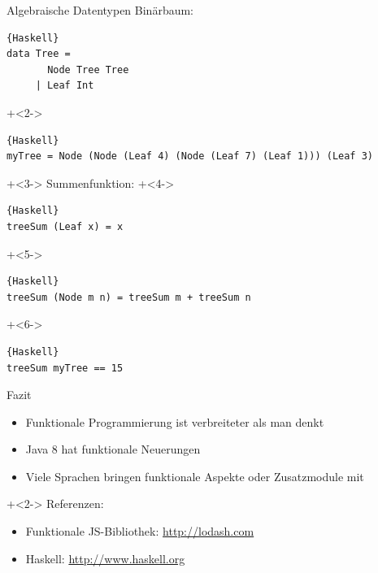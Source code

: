 \begin{frame}[fragile]{Algebraische Datentypen}
Binärbaum:
\begin{lstlisting}{Haskell}
data Tree =
       Node Tree Tree
     | Leaf Int
\end{lstlisting}

\onslide+<2->
\begin{lstlisting}{Haskell}
myTree = Node (Node (Leaf 4) (Node (Leaf 7) (Leaf 1))) (Leaf 3)
\end{lstlisting}


\onslide+<3->
Summenfunktion:
\onslide+<4->
\begin{lstlisting}{Haskell}
treeSum	(Leaf x) = x
\end{lstlisting}
\onslide+<5->
\vspace{-1.1em}
\begin{lstlisting}{Haskell}
treeSum (Node m n) = treeSum m + treeSum n
\end{lstlisting}
\onslide+<6->
\begin{lstlisting}{Haskell}
treeSum myTree == 15
\end{lstlisting}
\end{frame}


\begin{frame}[fragile]{Fazit}
\begin{itemize}
\item Funktionale Programmierung ist verbreiteter als man denkt
\item Java 8 hat funktionale Neuerungen
\item Viele Sprachen bringen funktionale Aspekte oder Zusatzmodule mit
\end{itemize}

\vfill

\onslide+<2->
Referenzen:

\begin{itemize}
\item Funktionale JS-Bibliothek: \url{http://lodash.com}
\item Haskell: \url{http://www.haskell.org}
\end{itemize}

\end{frame}




